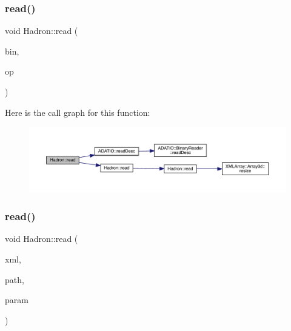 \subsubsection{\texorpdfstring{read()}{read()}\hspace{0.1cm}{\footnotesize\ttfamily [70/94]}}
{\footnotesize\ttfamily void Hadron\+::read (\begin{DoxyParamCaption}\item[{\mbox{\hyperlink{classADATIO_1_1BinaryReader}{Binary\+Reader}} \&}]{bin,  }\item[{\mbox{\hyperlink{structHadron_1_1HadronVertex__t}{Hadron\+Vertex\+\_\+t}} \&}]{op }\end{DoxyParamCaption})}

Here is the call graph for this function\+:\nopagebreak
\begin{figure}[H]
\begin{center}
\leavevmode
\includegraphics[width=350pt]{d1/daf/namespaceHadron_a2aedc52f1b4f522f0fc13bbf7426e727_cgraph}
\end{center}
\end{figure}
\mbox{\label{namespaceHadron_a6ee3d9a9ffb4f6e626fa1a73b49c9ee0}} 
\subsubsection{\texorpdfstring{read()}{read()}\hspace{0.1cm}{\footnotesize\ttfamily [71/94]}}
{\footnotesize\ttfamily void Hadron\+::read (\begin{DoxyParamCaption}\item[{\mbox{\hyperlink{classADATXML_1_1XMLReader}{X\+M\+L\+Reader}} \&}]{xml,  }\item[{const std\+::string \&}]{path,  }\item[{\mbox{\hyperlink{structHadron_1_1KeyHadronSUNNPartIrrepOp__t}{Key\+Hadron\+S\+U\+N\+N\+Part\+Irrep\+Op\+\_\+t}} \&}]{param }\end{DoxyParamCaption})}



